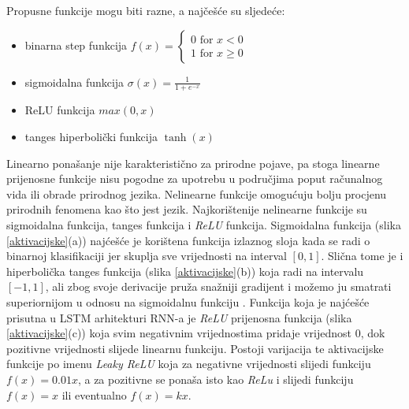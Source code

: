 \documentclass[times, utf8, zavrsni]{fer}
\begin{document}
Propusne funkcije mogu biti razne, a najčešće su sljedeće:
\begin{itemize}
	\item binarna step funkcija $f(x)=\left\{\begin{array}{l}0 \text { for } x<0 \\1 \text { for } x \geq 0\end{array}\right.$
	\item sigmoidalna funkcija $\sigma(x)=\frac{1}{1+e^{-x}}$
	\item ReLU funkcija $max(0,x)$
	\item tanges hiperbolički funkcija $\tanh(x)$
\end{itemize}
Linearno ponašanje nije karakteristično za prirodne pojave, pa stoga linearne prijenosne funkcije nisu pogodne za upotrebu u područjima poput računalnog vida ili obrade prirodnog jezika. Nelinearne funkcije omogućuju bolju procjenu prirodnih fenomena kao što jest jezik. Najkorištenije nelinearne funkcije su sigmoidalna funkcija, tanges funkcija i \emph{ReLU} funkcija. Sigmoidalna funkcija (slika \ref{aktivacijske}(a)) najćešće je korištena funkcija izlaznog sloja kada se radi o binarnoj klasifikaciji jer skuplja sve vrijednosti na interval $[0,1]$. Slična tome je i hiperbolička tanges funkcija (slika \ref{aktivacijske}(b)) koja radi na intervalu $[-1,1]$, ali zbog svoje derivacije pruža snažniji gradijent i možemo ju smatrati superiornijom u odnosu na sigmoidalnu funkciju \citep{akt}. Funkcija koja je najćešće prisutna u \gls{LSTM} arhitekturi \gls{RNN}-a je \emph{ReLU} prijenosna funkcija (slika \ref{aktivacijske}(c)) koja svim negativnim vrijednostima pridaje vrijednost 0, dok pozitivne vrijednosti slijede linearnu funkciju. Postoji varijacija te aktivacijske funkcije po imenu \emph{Leaky ReLU} koja za negativne vrijednosti slijedi funkciju $f(x) = 0.01x$, a za pozitivne se ponaša isto kao \emph{ReLu} i slijedi funkciju $f(x) = x$ ili eventualno $f(x) = kx$.
\end{document}
